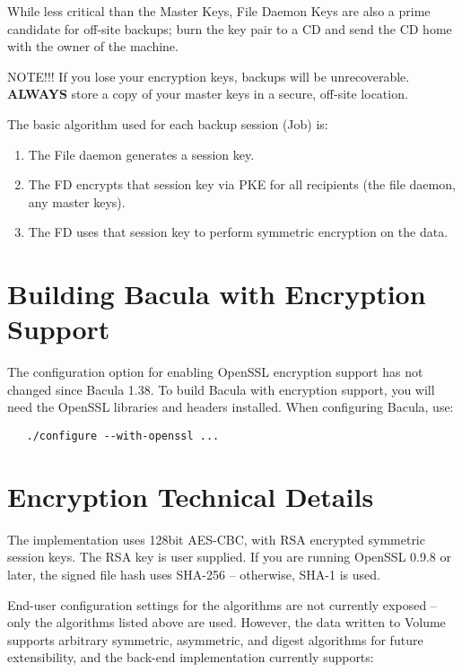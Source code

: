 While less critical than the Master Keys, File Daemon Keys are also a prime
candidate for off-site backups; burn the key pair to a CD and send the CD
home with the owner of the machine.

NOTE!!! If you lose your encryption keys, backups will be unrecoverable.
{\bf ALWAYS} store a copy of your master keys in a secure, off-site location.

The basic algorithm used for each backup session (Job) is:
\begin{enumerate}
\item The File daemon generates a session key.
\item The FD encrypts that session key via PKE for all recipients (the file  
daemon, any master keys).
\item The FD uses that session key to perform symmetric encryption on the data.
\end{enumerate}


\section{Building Bacula with Encryption Support}

The configuration option for enabling OpenSSL encryption support has not changed
since Bacula 1.38. To build Bacula with encryption support, you will need
the OpenSSL libraries and headers installed.  When configuring Bacula, use:

\begin{verbatim}
   ./configure --with-openssl ...
\end{verbatim}

\section{Encryption Technical Details}

The implementation uses 128bit AES-CBC, with RSA encrypted symmetric
session keys. The RSA key is user supplied.
If you are running OpenSSL 0.9.8 or later, the signed file hash uses
SHA-256 -- otherwise, SHA-1 is used.

End-user configuration settings for the algorithms are not currently
exposed -- only the algorithms listed above are used. However, the
data written to Volume supports arbitrary symmetric, asymmetric, and
digest algorithms for future extensibility, and the back-end
implementation currently supports:

